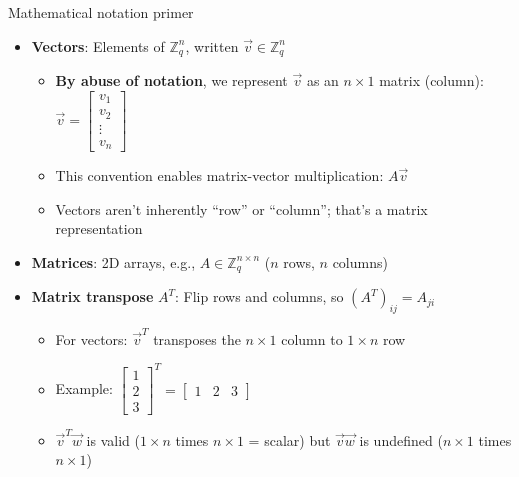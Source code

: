 \ifdefined\PRESENTATION\else\PassOptionsToClass{handout}{beamer}\fi\documentclass[aspectratio=169, lualatex]{beamer}
\begin{document}
\begin{frame}{Mathematical notation primer}
	\begin{itemize}
		\item \textbf{Vectors}: Elements of $\mathbb{Z}_q^n$, written $\vec{v} \in \mathbb{Z}_q^n$
		      \begin{itemize}
			      \item \textbf{By abuse of notation}, we represent $\vec{v}$ as an $n \times 1$
			            matrix (column): $\vec{v} = \begin{bmatrix} v_1 \\ v_2 \\ \vdots \\ v_n \end{bmatrix}$
			      \item This convention enables matrix-vector multiplication: $A\vec{v}$
			      \item Vectors aren't inherently ``row'' or ``column''; that's a matrix representation
		      \end{itemize}

		\item \textbf{Matrices}: 2D arrays, e.g., $A \in \mathbb{Z}_q^{n \times n}$
		      ($n$ rows, $n$ columns)

		\item \textbf{Matrix transpose} $A^T$: Flip rows and columns, so $(A^T)_{ij} = A_{ji}$
		      \begin{itemize}
			      \item For vectors: $\vec{v}^T$ transposes the $n \times 1$ column to $1 \times n$ row
			      \item Example: $\begin{bmatrix} 1 \\ 2 \\ 3 \end{bmatrix}^T = \begin{bmatrix} 1 & 2 & 3 \end{bmatrix}$
			      \item $\vec{v}^T\vec{w}$ is valid ($1 \times n$ times $n \times 1$ = scalar) but $\vec{v}\vec{w}$ is undefined ($n \times 1$ times $n \times 1$)
		      \end{itemize}
	\end{itemize}
\end{frame}
\end{document}
